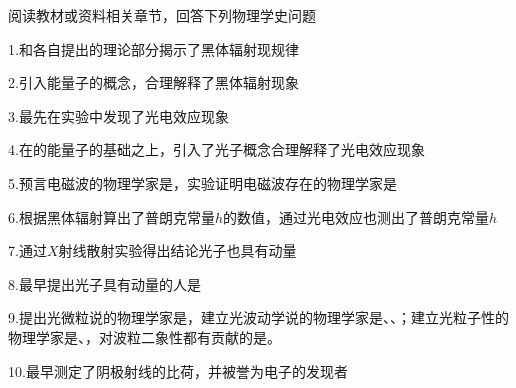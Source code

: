 阅读教材或资料相关章节，回答下列物理学史问题
	
	1.\lunl{3em}和\lunl{3em}各自提出的理论部分揭示了黑体辐射现规律

	2.\lunl{4em}引入能量子的概念，合理解释了黑体辐射现象

	3.\lunl{3em}最先在实验中发现了光电效应现象

	4.\lunl{4em}在\lunl{3em}的能量子的基础之上，引入了光子概念合理解释了光电效应现象

	5.预言电磁波的物理学家是\lunl{5em}，实验证明电磁波存在的物理学家是\lunl{3em}

	6.\lunl{4em}根据黑体辐射算出了普朗克常量\(h\)的数值，\lunl{4em}通过光电效应也测出了普朗克常量\(h\)

	7.\lunl{4em}通过\(X\)射线散射实验得出结论光子也具有动量

	8.最早提出光子具有动量的人是\lunl{5em}

	9.提出光微粒说的物理学家是\lunl{3em}，建立光波动学说的物理学家是\lunl{5em}、\lunl{4em}、\lunl{4em}；建立光粒子性的物理学家是\lunl{4em}、\lunl{4em}，对波粒二象性都有贡献的是\lunl{3em}。

	10.\lunl{5em}最早测定了阴极射线的比荷，并被誉为电子的发现者